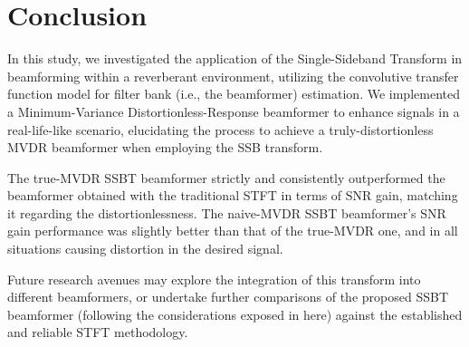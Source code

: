 \section{Conclusion}
\label{sec:conclusion}

In this study, we investigated the application of the Single-Sideband Transform in beamforming within a reverberant environment, utilizing the convolutive transfer function model for filter bank (i.e., the beamformer) estimation. We implemented a Minimum-Variance Distortionless-Response beamformer to enhance signals in a real-life-like scenario, elucidating the process to achieve a truly-distortionless MVDR beamformer when employing the SSB transform.

The true-MVDR SSBT beamformer strictly and consistently outperformed the beamformer obtained with the traditional STFT in terms of SNR gain, matching it regarding the distortionlessness. The naive-MVDR SSBT beamformer's SNR gain performance was slightly better than that of the true-MVDR one, and in all situations causing distortion in the desired signal.

Future research avenues may explore the integration of this transform into different beamformers, or undertake further comparisons of the proposed SSBT beamformer (following the considerations exposed in here) against the established and reliable STFT methodology.